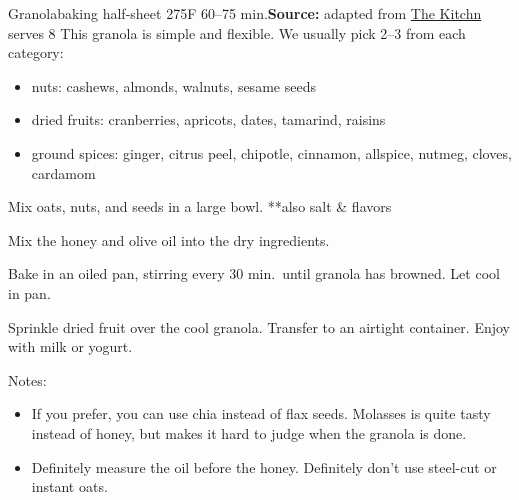 \begin{recipe}{Granola}{baking half-sheet \hfill 275\0F \hfill 60--75 min.}{\textbf{Source:} adapted from \href{https://www.thekitchn.com/granola-recipe-258376}{The Kitchn} \hfill serves 8}
 \freeform This granola is simple and flexible. We usually pick 2--3 from each category:
 \begin{itemize}
  \item nuts: cashews, almonds, walnuts, sesame seeds
  \item dried fruits: cranberries, apricots, dates, tamarind, raisins
  \item ground spices: ginger, citrus peel, chipotle, cinnamon, allspice, nutmeg, cloves, cardamom
 \end{itemize}

 Mix oats, nuts, and seeds in a large bowl. **also salt \& flavors

 Mix the honey and olive oil into the dry ingredients.

 \newstep Bake in an oiled pan, stirring every 30 min.\ until granola has browned. Let cool in pan.

 Sprinkle dried fruit over the cool granola. Transfer to an airtight container. Enjoy with milk or yogurt.

 \freeform Notes:
 \begin{itemize}
  \item If you prefer, you can use chia instead of flax seeds. Molasses is quite tasty instead of honey, but makes it hard to judge when the granola is done.
  \item Definitely measure the oil before the honey. Definitely don't use steel-cut or instant oats.
 \end{itemize}
\end{recipe}
